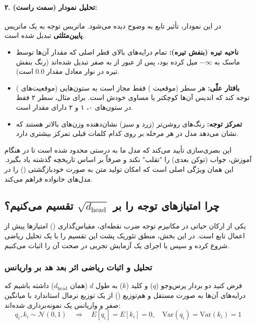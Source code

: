 \documentclass{article}
\begin{document}
\paragraph{۲. تحلیل نمودار  (سمت راست):}
در این نمودار، تأثیر تابع  به وضوح دیده می‌شود. ماتریس توجه به یک ماتریس \textbf{پایین‌مثلثی} تبدیل شده است.
\begin{itemize}
	\item \textbf{ناحیه تیره (بنفش تیره):} تمام درایه‌های بالای قطر اصلی که مقدار آن‌ها توسط ماسک به $-\infty$ میل کرده بود، پس از عبور از  به صفر تبدیل شده‌اند (رنگ بنفش تیره در نوار  معادل مقدار $0.0$ است).
	\item \textbf{بافتار علّی:} هر سطر (موقعیت ) فقط مجاز است به ستون‌هایی (موقعیت‌های ) توجه کند که اندیس آن‌ها کوچکتر یا مساوی خودش است. برای مثال، سطر ۲ فقط در ستون‌های ۰، ۱ و ۲ دارای مقدار است.
	\item \textbf{تمرکز توجه:} رنگ‌های روشن‌تر (زرد و سبز) نشان‌دهنده وزن‌های بالاتر هستند که نشان می‌دهد مدل در هر مرحله بر روی کدام کلمات قبلی تمرکز بیشتری دارد.
\end{itemize}

این بصری‌سازی تأیید می‌کند که مدل ما به درستی محدود شده است تا در هنگام آموزش، جواب (توکن بعدی) را "تقلب" نکند و صرفاً بر اساس تاریخچه گذشته یاد بگیرد. این همان ویژگی اصلی است که امکان تولید متن به صورت خود‌بازگشتی () را در مدل‌های خانواده  فراهم می‌کند.

\subsection{چرا امتیازهای توجه را بر $\sqrt{d_{\mathrm{head}}}$ تقسیم می‌کنیم؟}

یکی از ارکان حیاتی در مکانیزم توجه ضرب نقطه‌ای، مقیاس‌گذاری () امتیازها پیش از اعمال تابع  است. در این بخش، منطق تئوریک پشت این تقسیم را با یک تحلیل ریاضی شروع کرده و سپس با اجرای یک آزمایش تجربی در  صحت آن را اثبات می‌کنیم.

\subsubsection*{تحلیل و اثبات ریاضی اثر بعد هد بر واریانس}

فرض کنید دو بردار پرس‌وجو ($q$) و کلید ($k$) به طول $d$ (همان $d_{\mathrm{head}}$) داشته باشیم که درایه‌های آن‌ها به صورت مستقل و هم‌توزیع () از یک توزیع نرمال استاندارد با میانگین صفر و واریانس یک نمونه‌برداری شده‌اند:
\[
q_i, k_i \sim \mathcal{N}(0, 1) \quad \Rightarrow \quad E[q_i] = E[k_i] = 0, \quad \mathrm{Var}(q_i) = \mathrm{Var}(k_i) = 1
\]
\end{document}
